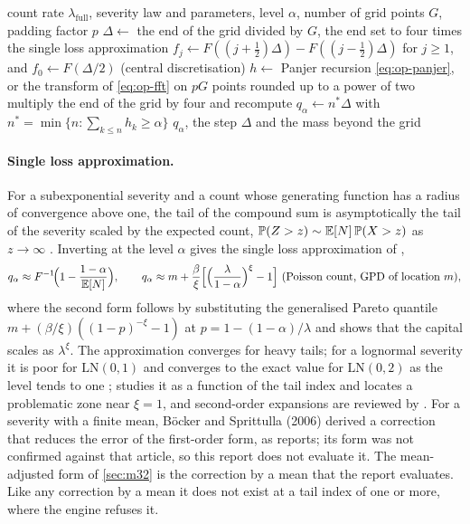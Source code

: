 \begin{algorithm}[htbp]
\caption{Capital of a fitted loss distribution approach by Panjer recursion and Fourier transform}
\label{alg:op-aggregate}
\begin{algorithmic}[1]
\Require count rate $\lambda_{\mathrm{full}}$, severity law and parameters, level $\alpha$, number of grid points $G$, padding factor $p$
\State $\Delta\leftarrow$ the end of the grid divided by $G$, the end set to four times the single loss approximation
\Repeat
\State $f_j\leftarrow F((j+\tfrac12)\Delta)-F((j-\tfrac12)\Delta)$ for $j\ge1$, and $f_0\leftarrow F(\Delta/2)$ (central discretisation)
\State $h\leftarrow$ Panjer recursion \cref{eq:op-panjer}, or the transform of \cref{eq:op-fft} on $pG$ points rounded up to a power of two
 \State multiply the end of the grid by four and recompute \EndIf
{}
\State $q_\alpha\leftarrow n^\ast\Delta$ with $n^\ast=\min\{n:\sum_{k\le n}h_k\ge\alpha\}$
\State \Return $q_\alpha$, the step $\Delta$ and the mass beyond the grid
\end{algorithmic}
\end{algorithm}

\paragraph{Single loss approximation.} For a subexponential severity and a count whose generating function has a radius of
convergence above one, the tail of the compound sum is asymptotically the tail of the severity scaled by the expected count,
$\mathbb{P}(Z>z)\sim\mathbb{E}[N]\,\mathbb{P}(X>z)$ as $z\to\infty$ \citep{oprisk:embrechts1997}. Inverting at the level $\alpha$ gives the
single loss approximation of \citet{oprisk:bocker2005},
\begin{equation}
q_\alpha\approx F^{-1}\!\Bigl(1-\frac{1-\alpha}{\E[N]}\Bigr),\qquad
q_\alpha\approx m+\frac{\beta}{\xi}\Bigl[\Bigl(\frac{\lambda}{1-\alpha}\Bigr)^{\xi}-1\Bigr]\ \text{(Poisson count, GPD of location $m$)},
\label{eq:op-sla}
\end{equation}
where the second form follows by substituting the generalised Pareto quantile $m+(\beta/\xi)((1-p)^{-\xi}-1)$ at
$p=1-(1-\alpha)/\lambda$ and shows that the capital scales as $\lambda^{\xi}$. The approximation converges for heavy tails; for a lognormal
severity it is poor for $\mathrm{LN}(0,1)$ and converges to the exact value for $\mathrm{LN}(0,2)$ as the level tends to one
\citep[Example~9.4]{oprisk:shevchenko2010}; \citet{oprisk:degen2010} studies it as a function of the tail
index and locates a problematic zone near $\xi=1$, and second-order expansions are reviewed by \citet{oprisk:peters2013}. For a severity with a finite mean,
B\"ocker and Sprittulla (2006) derived a correction that reduces the error of the first-order form, as \citet{oprisk:shevchenko2010} reports; its
form was not confirmed against that article, so this report does not evaluate it. The mean-adjusted form of \cref{sec:m32} is the correction by a mean
that the report evaluates. Like any correction by a mean it does not exist at a tail index of one or more, where the engine refuses it.


